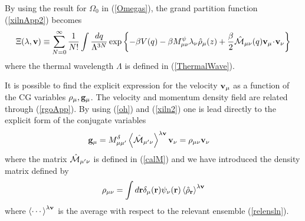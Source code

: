 \documentclass[b5paper,openright,11pt]{book}
\newcommand{\esc}{\!\cdot\!}
\newcommand{\llangle}{\left\langle}
\newcommand{\rrangle}{\right\rangle}
\begin{document}
\begin{appendices}
By using the result for $\Omega_0$ in (\ref{Omegas}),  the  grand  partition  function
(\ref{xilnApp2}) becomes
\begin{align}
\Xi(\lambda,{\bf v})\equiv \sum_{N=0}^\infty \frac{1}{N!}
\int \frac{dq}{\Lambda^{3N}}
\exp\left\{-\beta V(q)-\beta M^\psi_{\mu\nu}\lambda_\nu\hat{\rho}_{\mu}(z)+\frac{\beta}{2}\hat{\cal M}_{\mu\nu}(q){\bf v}_\mu \esc{\bf v}_\nu
\right\}
\label{xiln2b}
\end{align}
where the thermal wavelength $\Lambda$ is  defined in (\ref{ThermalWave}).



It is possible to find the  explicit expression for the velocity ${\bf
  v}_\mu$ as  a function of  the CG variables  $\rho_\mu,{\bf g}_\mu$.
The  velocity   and  momentum   density  field  are   related  through
(\ref{rgoApp}).   By  using  (\ref{oh})  and (\ref{xiln2})  one  is  lead
directly to the explicit form of the conjugate variables
\begin{align}
{\bf g}_\mu&=M^\delta_{\mu\mu'}\llangle \hat{\cal M}_{\mu'\nu}\rrangle^{\lambda {\bf v}} {\bf v}_\nu =\rho_{\mu\nu}{\bf v}_\nu
\label{nu2}
\end{align}
where the  matrix $\hat{\cal M}_{\mu'\nu}$ is  defined in (\ref{calM})
and we have introduced the density matrix defined by
\begin{align}
  \rho_{\mu\nu} =\int d{\bf r}
\delta_\mu({\bf r})\psi_\nu({\bf r})\llangle\hat{\rho}_{\bf r}\rrangle^{\lambda{\bf v}}
\end{align}
where $\llangle\cdots\rrangle^{\lambda{\bf v}}$  is the average  with respect
to   the  relevant   ensemble   (\ref{relensln}). 


\end{appendices}
\end{document}
